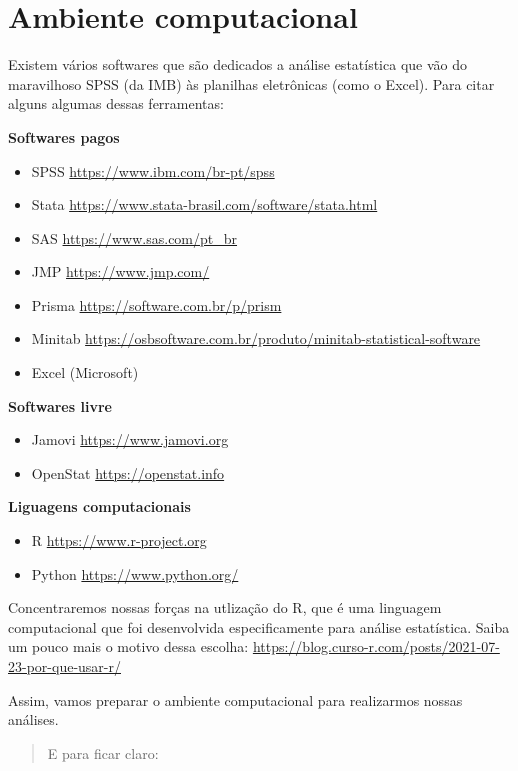 \documentclass[
]{book}
\begin{document}
\chapter{Ambiente computacional}\label{ambiente-computacional}

Existem vários softwares que são dedicados a análise estatística que vão do maravilhoso SPSS (da IMB) às planilhas eletrônicas (como o Excel). Para citar alguns algumas dessas ferramentas:

\textbf{Softwares pagos}

\begin{itemize}
\item
  SPSS \url{https://www.ibm.com/br-pt/spss}
\item
  Stata \url{https://www.stata-brasil.com/software/stata.html}
\item
  SAS \url{https://www.sas.com/pt_br}
\item
  JMP \url{https://www.jmp.com/}
\item
  Prisma \url{https://software.com.br/p/prism}
\item
  Minitab \url{https://osbsoftware.com.br/produto/minitab-statistical-software}
\item
  Excel (Microsoft)
\end{itemize}

\textbf{Softwares livre}

\begin{itemize}
\item
  Jamovi \url{https://www.jamovi.org}
\item
  OpenStat \url{https://openstat.info}
\end{itemize}

\textbf{Liguagens computacionais}

\begin{itemize}
\item
  R \url{https://www.r-project.org}
\item
  Python \url{https://www.python.org/}
\end{itemize}

Concentraremos nossas forças na utlização do R, que é uma linguagem computacional que foi desenvolvida especificamente para análise estatística. Saiba um pouco mais o motivo dessa escolha: \url{https://blog.curso-r.com/posts/2021-07-23-por-que-usar-r/}

Assim, vamos preparar o ambiente computacional para realizarmos nossas análises.

\begin{quote}
E para ficar claro:
\end{quote}
\end{document}
